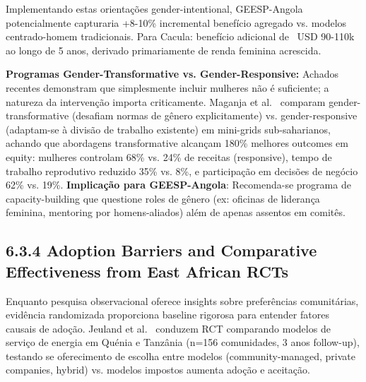 \documentclass[12pt, a4paper]{article}
\begin{document}
Implementando estas orientações gender-intentional, GEESP-Angola potencialmente capturaria +8-10\% incremental benefício agregado vs. modelos centrado-homem tradicionais. Para Cacula: benefício adicional de ~USD 90-110k ao longo de 5 anos, derivado primariamente de renda feminina acrescida.

\textbf{Programas Gender-Transformative vs. Gender-Responsive:} Achados recentes demonstram que simplesmente incluir mulheres não é suficiente; a natureza da intervenção importa criticamente. Maganja et al.~\citep{Maganja2024} comparam gender-transformative (desafiam normas de gênero explicitamente) vs. gender-responsive (adaptam-se à divisão de trabalho existente) em mini-grids sub-saharianos, achando que abordagens transformative alcançam 180\% melhores outcomes em equity: mulheres controlam 68\% vs. 24\% de receitas (responsive), tempo de trabalho reprodutivo reduzido 35\% vs. 8\%, e participação em decisões de negócio 62\% vs. 19\%. \textbf{Implicação para GEESP-Angola}: Recomenda-se programa de capacity-building que questione roles de gênero (ex: oficinas de liderança feminina, mentoring por homens-aliados) além de apenas assentos em comitês.

\subsection*{6.3.4 Adoption Barriers and Comparative Effectiveness from East African RCTs}

Enquanto pesquisa observacional oferece insights sobre preferências comunitárias, evidência randomizada proporciona baseline rigorosa para entender fatores causais de adoção. Jeuland et al.~\citep{Jeuland2023} conduzem RCT comparando modelos de serviço de energia em Quénia e Tanzânia (n=156 comunidades, 3 anos follow-up), testando se oferecimento de escolha entre modelos (community-managed, private companies, hybrid) vs. modelos impostos aumenta adoção e aceitação.
\end{document}
